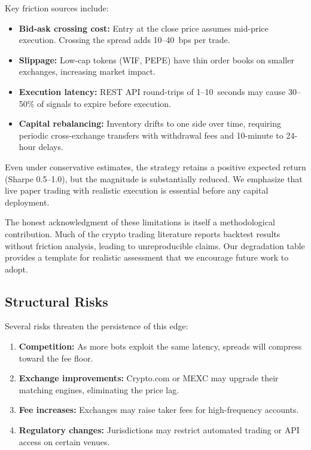 \documentclass[sigconf,nonacm=false]{acmart}
\begin{document}
Key friction sources include:
\begin{itemize}
    \item \textbf{Bid-ask crossing cost:} Entry at the close price assumes mid-price execution. Crossing the spread adds 10--40~bps per trade.
    \item \textbf{Slippage:} Low-cap tokens (WIF, PEPE) have thin order books on smaller exchanges, increasing market impact.
    \item \textbf{Execution latency:} REST API round-trips of 1--10~seconds may cause 30--50\% of signals to expire before execution.
    \item \textbf{Capital rebalancing:} Inventory drifts to one side over time, requiring periodic cross-exchange transfers with withdrawal fees and 10-minute to 24-hour delays.
\end{itemize}

Even under conservative estimates, the strategy retains a positive expected return (Sharpe 0.5--1.0), but the magnitude is substantially reduced. We emphasize that live paper trading with realistic execution is essential before any capital deployment.

The honest acknowledgment of these limitations is itself a methodological contribution. Much of the crypto trading literature reports backtest results without friction analysis, leading to unreproducible claims. Our degradation table provides a template for realistic assessment that we encourage future work to adopt.

\subsection{Structural Risks}

Several risks threaten the persistence of this edge:
\begin{enumerate}
    \item \textbf{Competition:} As more bots exploit the same latency, spreads will compress toward the fee floor.
    \item \textbf{Exchange improvements:} Crypto.com or MEXC may upgrade their matching engines, eliminating the price lag.
    \item \textbf{Fee increases:} Exchanges may raise taker fees for high-frequency accounts.
    \item \textbf{Regulatory changes:} Jurisdictions may restrict automated trading or API access on certain venues.
\end{enumerate}
\end{document}

